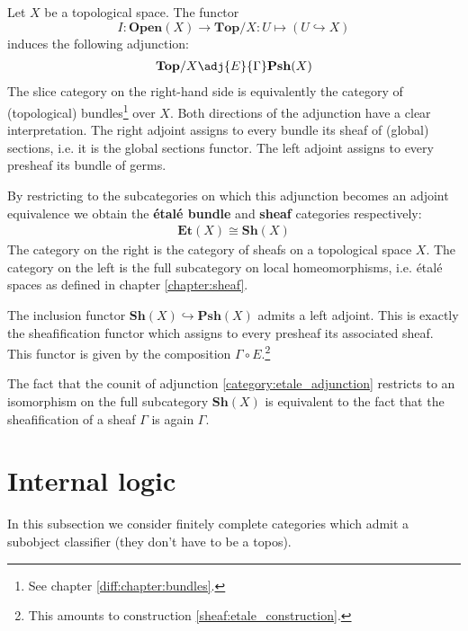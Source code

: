 	\begin{construct}
		Let $X$ be a topological space. The functor \[I:\textbf{Open}(X)\rightarrow\textbf{Top}/X:U\mapsto(U\hookrightarrow X)\] induces the following adjunction:
		\begin{gather}
			\label{category:etale_adjunction}
			 \mathbf{Top}/X\adj{E}{\Gamma}\mathbf{Psh}(X)
		\end{gather}
		The slice category on the right-hand side is equivalently the category of (topological) bundles\footnote{See chapter \ref{diff:chapter:bundles}.} over $X$. Both directions of the adjunction have a clear interpretation. The right adjoint assigns to every bundle its sheaf of (global) sections, i.e. it is the global sections functor. The left adjoint assigns to every presheaf its bundle of germs.
		
		By restricting to the subcategories on which this adjunction becomes an adjoint equivalence we obtain the \textbf{\'etal\'e bundle} and \textbf{sheaf} categories respectively:
		\begin{gather}
			\textbf{Et}(X)\cong\textbf{Sh}(X)
		\end{gather}
		The category on the right is the category of sheafs on a topological space $X$. The category on the left is the full subcategory on local homeomorphisms, i.e. \'etal\'e spaces as defined in chapter \ref{chapter:sheaf}.
	\end{construct}
	
	\begin{property}
		The inclusion functor $\textbf{Sh}(X)\hookrightarrow\textbf{Psh}(X)$ admits a left adjoint. This is exactly the sheafification functor which assigns to every presheaf its associated sheaf. This functor is given by the composition $\Gamma\circ E$.\footnote{This amounts to construction \ref{sheaf:etale_construction}.}
		
		The fact that the counit of adjunction \ref{category:etale_adjunction} restricts to an isomorphism on the full subcategory $\textbf{Sh}(X)$ is equivalent to the fact that the sheafification of a sheaf $\Gamma$ is again $\Gamma$.
	\end{property}

	
\section{Internal logic}\label{cat:internal_logic}

	In this subsection we consider finitely complete categories which admit a subobject classifier (they don't have to be a topos).
	
